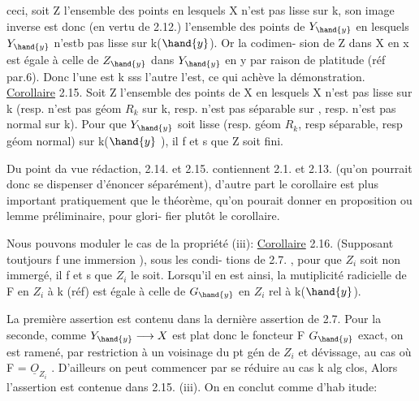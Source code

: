 
ceci, soit Z l'ensemble des points en lesquels X n'est pas lisse sur
k, son image inverse  est donc (en vertu de 2.12.)   l'ensemble des
points de $Y_{\hand{y}}$ en lesquels $Y_{\hand{y}}$ n'estb pas lisse sur k($\hand{y}$). Or  la codimen-%
sion de  Z dans X en x  est égale à celle de  $Z_{\hand{y}}$ dans $Y_{\hand{y}}$  en y par
raison de platitude (réf par.6). Donc l'une est \hand{$>$}k  sss l'autre l'est,
ce qui achève la démonstration.
\uline{Corollaire} 2.15.   Soit Z l'ensemble des points de X en lesquels
X n'est pas lisse sur k (resp. n'est pas  géom $R_k$ sur k, resp. n'est
\margin{\unsure{//}} pas séparable sur  , resp. n'est pas  normal sur k). Pour que $Y_{\hand{y}}$ soit
lisse (resp.  géom $R_k$, resp séparable, resp géom normal) sur k($\hand{y}$ ), il
f et s  que Z soit fini.

\margin{$|$} Du point da vue rédaction, 2.14. et 2.15.  contiennent 2.1. et
2.13. (qu'on pourrait donc se dispenser d'énoncer séparément), d'autre
part le corollaire est plus important pratiquement que le théorème,
qu'on pourait donner en proposition ou lemme préliminaire, pour glori-%
fier plutôt le corollaire.

Nous pouvons  moduler   le cas de la propriété (iii):
\uline{Corollaire} 2.16.  (Supposant toutjours f une immersion ), sous les condi-%
\margin{\unsure{//}} tions de 2.7. , pour que $Z_i$ soit non immergé, il f et s que $Z_i$  le soit.
Lorsqu'il en est ainsi, la mutiplicité radicielle de F en $Z_i$  
à k (réf) est égale à celle de $G_{\hand{y}}$  en $Z_i$  rel à k($\hand{y}$).

La première assertion est contenu dans la dernière assertion de
2.7. Pour la seconde, comme  $Y_{\hand{y}} \longrightarrow X$ est plat donc le foncteur F \hand{$\rightsquigarrow$} $G_{\hand{y}}$
exact,  on est ramené, par restriction à un voisinage du pt gén de $Z_i$
et dévissage, au cas où F = $\underline{O}_{Z_i}$  . D'ailleurs on peut commencer par
se réduire au cas k alg clos,  Alors  l'assertion  est
contenue dans 2.15. (iii).   On en conclut comme d'hab itude:

